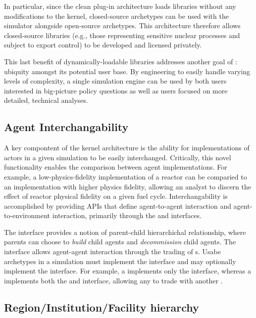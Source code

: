In particular, since the clean plug-in architecture loads libraries without any
modifications to the \Cyclus kernel, closed-source archetypes can be used with
the simulator alongside open-source archetypes. This architecture therefore
allows closed-source libraries (e.g., those representing sensitive nuclear
processes and subject to export control) to be developed and licensed privately.

This last benefit of dynamically-loadable libraries addresses
another goal of \Cyclus: ubiquity amongst its potential user base. By
engineering \Cyclus to easily handle varying levels of complexity, a single
simulation engine can be used by both users interested in big-picture policy
questions as well as users focused on more detailed, technical
analyses.

\subsection{Agent Interchangability}

A key compontent of the \Cyclus kernel architecture is the ability for
implementations of actors in a given simulation to be easily
interchanged. Critically, this novel functionality enables the comparison
between agent implementations. For example, a low-physics-fidelity
implementation of a reactor can be comparied to an implementation with higher
physics fidelity, allowing an analyst to discern the effect of reactor physical
fidelity on a given fuel cycle. Interchangability is accomplished by providing
APIs that define agent-to-agent interaction and agent-to-environment
interaction, primarily through the  and  interfaces.

The  interface provides a notion of parent-child hierarchichal
relationship, where parents can choose to \textit{build} child agents and
\textit{decommission} child agents. The  interface allows
agent-agent interaction through the trading of s. Usabe
archetypes in a \Cyclus simulation must implement the  interface
and may optionally implement the  interface. For example, a
 implements only the  interface, whereas a
 implements both the  and  interface,
allowing any  to trade with another .

\subsection{Region/Institution/Facility hierarchy}


